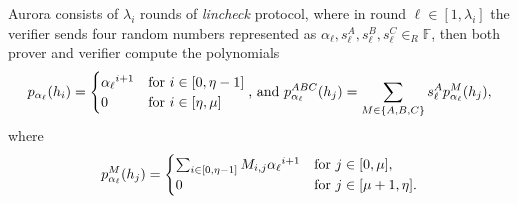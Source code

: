 Aurora consists of $\lambda_i$ rounds of \textit{lincheck} protocol, where in round $\ell \in [1,\lambda_i]$ the verifier sends four random numbers represented as $\alpha_\ell, s^A_\ell, s^B_\ell, s^C_\ell  \in_R \mathbb{F}$, then both prover and verifier compute the polynomials
\begin{equation}\label{eq:pa}
	p_{\alpha_\ell}(h_i) = \begin{cases}
		{\alpha_\ell} ^ {i+1} & \text{for $i \in [0,\eta-1]$}\\
		0          & \text{for $ i  \in [\eta,  \mu]$}%
\end{cases}
\text{, and }
p^{ABC}_{\alpha_\ell}(h_j) = 
\sum_{M\in \{A, B, C\}} s^A_\ell p^{M}_{\alpha_\ell}(h_j),%
\end{equation}
where
\begin{equation}\label{eq:paABC}
p^{M}_{\alpha_\ell}(h_j) =  \begin{cases}
\sum_{i\in[0,\eta-1]} M_{i,j}{\alpha_\ell} ^ {i+1} & \text{for $j \in [0,\mu]$},\\
0          & \text{for $ j  \in [\mu+1,  \eta]$}.%
\end{cases}
\end{equation}

